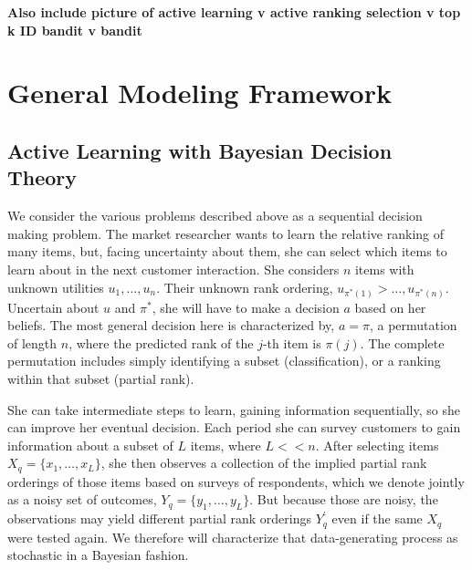 \documentclass[a4paper,12pt]{article}
\newcommand{\numitems}{n}
\newcommand{\numperset}{L}
\begin{document}



\textbf{Also include picture of active learning v active ranking selection v top k ID bandit v bandit}


\section{General Modeling Framework}


\subsection{Active Learning with Bayesian Decision Theory}

We consider the various problems described above as a sequential decision making problem. The market researcher wants to learn the relative ranking of many items, but, facing uncertainty about them, she can select which items to learn about in the next customer interaction. She considers $n$ items with unknown utilities $u_1, \ldots, u_\numitems$. Their unknown rank ordering, $u_{\pi^{*}(1)} > \ldots, u_{\pi^{*}(\numitems)}$. Uncertain about $u$ and $\pi^{*}$, she will have to make a decision $a$ based on her beliefs. The most general decision here is characterized by, $a=\pi$, a permutation of length $\numitems$, where the predicted rank of the $j$-th item is $\pi(j)$. The complete permutation includes simply identifying a subset (classification), or a ranking within that subset (partial rank). 

She can take intermediate steps to learn, gaining information sequentially, so she can improve her eventual decision. Each period she can survey customers to gain information about a subset of $\numperset$ items, where $\numperset << \numitems$. After selecting items $X_q = \{ x_1,\ldots, x_\numperset \}$, she then observes a collection of the implied partial rank orderings of those items based on surveys of respondents, which we denote jointly as a noisy set of outcomes, $Y_q = \{ y_1,\ldots, y_\numperset \}$. But because those are noisy, the observations may yield different partial rank orderings $Y_q^{'}$ even if the same $X_q$ were tested again. We therefore will characterize that data-generating process as stochastic in a Bayesian fashion. 
\end{document}
